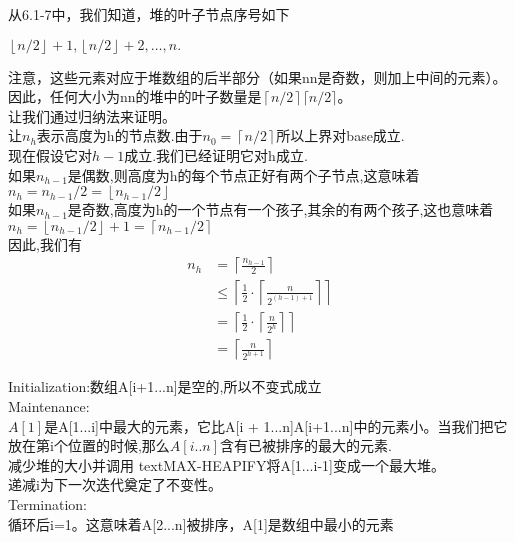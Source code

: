 \documentclass[a4paper, justified]{tufte-handout}
\begin{document}
\begin{solution}
  从6.1-7中，我们知道，堆的叶子节点序号如下

  $\left\lfloor n / 2 \right\rfloor + 1, \left\lfloor n / 2 \right\rfloor + 2, \dots, n.$

  注意，这些元素对应于堆数组的后半部分（如果nn是奇数，则加上中间的元素）。因此，任何大小为nn的堆中的叶子数量是$\left\lceil n / 2\right\rceil⌈n/2⌉$。\\
  让我们通过归纳法来证明。\\
  让$n_h$表示高度为h的节点数.由于$n_0 = \left\lceil n / 2 \right\rceil$所以上界对base成立.\\
  现在假设它对$h-1$成立.我们已经证明它对h成立.\\
  如果$n_{h-1}$是偶数,则高度为h的每个节点正好有两个子节点,这意味着$n_h = n_{h - 1} / 2 = \left\lfloor n_{h - 1} / 2 \right\rfloor$\\
  如果$n_{h-1}$是奇数,高度为h的一个节点有一个孩子,其余的有两个孩子,这也意味着$n_h = \left\lfloor n_{h - 1} / 2 \right\rfloor + 1 = \left\lceil n_{h - 1} / 2 \right\rceil$\\
  因此,我们有
  $$
    \begin{aligned}
      n_h & = \left\lceil \frac{n_{h - 1}}{2} \right\rceil                                                    \\
          & \le \left\lceil \frac{1}{2} \cdot \left\lceil \frac{n}{2^{(h - 1) + 1}} \right\rceil \right\rceil \\
          & = \left\lceil \frac{1}{2} \cdot \left\lceil \frac{n}{2^h} \right\rceil \right\rceil               \\
          & = \left\lceil \frac{n}{2^{h + 1}} \right\rceil
    \end{aligned}
  $$

\end{solution}

\begin{problem}[TC 6.4-2]
\end{problem}

\begin{solution}
  Initialization:数组A[i+1...n]是空的,所以不变式成立\\
  Maintenance:\\
  $A[1]$是A[1...i]中最大的元素，它比A[i + 1...n]A[i+1...n]中的元素小。当我们把它放在第i个位置的时候,那么$A[i..n]$含有已被排序的最大的元素.\\
  减少堆的大小并调用 text{MAX-HEAPIFY}将A[1...i-1]变成一个最大堆。\\
  递减i为下一次迭代奠定了不变性。\\
  Termination:\\
  循环后i=1。这意味着A[2...n]被排序，A[1]是数组中最小的元素\\
\end{solution}
\end{document}
